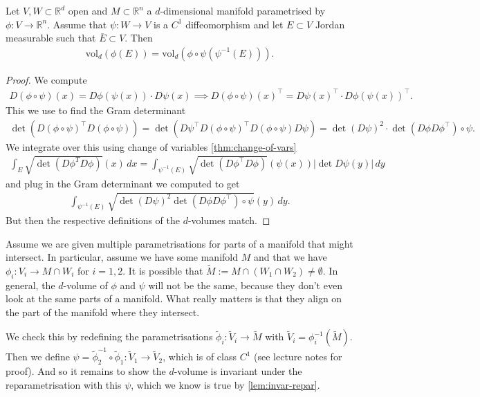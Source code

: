 \begin{lemma}\label{lem:invar-repar}
	Let $V, W \subset \mathbb{R}^{d}$ open and $M \subset \mathbb{R}^{n}$ a $d$-dimensional manifold parametrised by $\phi: V \to \mathbb{R}^{n}$. Assume that $\psi: W \to V$ is a $C^{1}$ diffeomorphism and let $E \subset V$ Jordan measurable such that $\overline{ E } \subset V$. Then
	\begin{align*}
		\text{vol}_{d}(\phi(E)) = \text{vol}_{d}(\phi \circ \psi( \psi^{-1}(E) )).
	\end{align*}
\end{lemma}
\begin{proof}
	We compute
	\begin{align*}
		D(\phi \circ \psi)(x) = D\phi(\psi(x)) \cdot D\psi(x) \implies D(\phi \circ \psi)(x)^\top = D\psi(x)^\top \cdot D \phi(\psi(x))^\top.
	\end{align*}
	This we use to find the Gram determinant
	\begin{align*}
		\det (D(\phi \circ \psi)^\top D(\phi \circ \psi)) = \det (D \psi^\top D(\phi \circ \psi)^\top D(\phi \circ \psi) D\psi) = \det (D \psi)^{2} \cdot \det (D\phi D\phi^\top) \circ \psi.
	\end{align*}
	We integrate over this using change of variables \ref{thm:change-of-vars}
	\begin{align*}
		\int_{E} \sqrt{\det (D \phi^{T} D \phi)}(x) \, dx = \int_{\psi^{-1}(E)} \sqrt{\det (D\phi^\top D\phi)}(\psi(x)) \left| \det D \psi(y) \right| \, dy
	\end{align*}
	and plug in the Gram determinant we computed to get
	\begin{align*}
		\int_{\psi^{-1}(E)} \sqrt{ \det (D \psi)^{2}\det (D\phi D\phi^\top) \circ \psi }(y)  \, dy.
	\end{align*}
	But then the respective definitions of the $d$-volumes match.
\end{proof}

\begin{remark}\label{rem:reparam}
	Assume we are given multiple parametrisations for parts of a manifold that might intersect. In particular, assume we have some manifold $M$ and that we have $\phi_{i}: V_{i} \to M \cap W_{i}$ for $i = 1,2$. It is possible that $\widetilde{M} := M \cap (W_{1} \cap W_{2}) \neq \emptyset$. In general, the $d$-volume of $\phi$ and $\psi$ will not be the same, because they don't even look at the same parts of a manifold. What really matters is that they align on the part of the manifold where they intersect.

	We check this by redefining the parametrisations $\tilde{\phi}_{i}: \widetilde{V}_{i} \to \widetilde{M}$ with $\widetilde{V}_{i} = \phi_{i}^{-1}(\widetilde{M})$. Then we define $\psi = \tilde{\phi}_{2}^{-1} \circ \tilde{\phi}_{1}: \widetilde{V}_{1} \to \widetilde{V}_{2}$, which is of class $C^{1}$ (see lecture notes for proof). And so it remains to show the $d$-volume is invariant under the reparametrisation with this $\psi$, which we know is true by \ref{lem:invar-repar}.
\end{remark}

